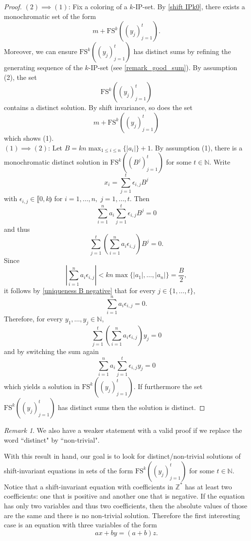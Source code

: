 \documentclass{article}
\theoremstyle{definition}
\theoremstyle{plain}
\theoremstyle{remark}
\newtheorem{remark}{Remark}[section]
\newcommand{\N}{\ensuremath{\mathbb{N}}}
\newcommand{\Z}{\ensuremath{\mathbb{Z}}}
\newcommand{\abs}[1]{\left | #1 \right |}
\newcommand{\FS}[2][]{\ensuremath{\mathrm{FS}^{#1}\left(#2\right)}}
\begin{document}
\begin{proof}
    $(2) \implies (1)$: Fix a coloring of a $k$-IP-set. By \cref{shift IPk0}, there exists a monochromatic set of the form
    $$m + \FS[k]{(y_j)_{j=1}^t}.$$
    Moreover, we can ensure $\FS[k]{(y_j)_{j=1}^t}$ has distinct sums by refining the generating sequence of the $k$-IP-set (see \cref{remark_good_sum}). By assumption (2), the set
    $$\FS[k]{(y_j)_{j=1}^t}$$
    contains a distinct solution. By shift invariance, so does the set
    $$m + \FS[k]{(y_j)_{j=1}^t}$$
    which shows (1).\\

    $(1) \implies (2)$: Let $B= kn \max_{1 \leq i \leq n} \{\abs{a_i}\} + 1$. By assumption (1), there is a monochromatic distinct solution in $\FS[k]{(B^j)_{j=1}^t}$ for some $t \in \N$.
    Write $$x_i= \sum_{j=1}^t \epsilon_{i,j} B^j$$ with $\epsilon_{i,j} \in \llbracket 0,k \rrparenthesis$ for $i=1,\ldots,n,\; j= 1,\ldots,t$. Then
    $$\sum_{i=1}^n a_i \sum_{j=1}^t \epsilon_{i,j} B^j = 0$$
    and thus
    $$\sum_{j=1}^t \left (\sum_{i=1}^n a_i  \epsilon_{i,j} \right ) B^j = 0.$$
    Since $$\abs{\sum_{i=1}^n a_i  \epsilon_{i,j}} < k n \max\{\abs{a_1},\ldots,\abs{a_n}\} = \frac{B}{2},$$
    it follows by \cref{uniqueness B negative} that for every $j\in \{1,\ldots,t\}$,
    $$\sum_{i=1}^n a_i  \epsilon_{i,j} = 0.$$
    Therefore, for every $y_1, \ldots, y_j \in \N$,
    $$\sum_{j=1}^t \left (\sum_{i=1}^n a_i  \epsilon_{i,j} \right ) y_j = 0$$
    and by switching the sum again
    $$\sum_{i=1}^n a_i \sum_{j=1}^t \epsilon_{i,j} y_j = 0$$
    which yields a solution in $\FS[k]{(y_j)_{j=1}^t}$. If furthermore the set $\FS[k]{(y_j)_{j=1}^t}$ has distinct sums then the solution is distinct.
\end{proof}
\begin{remark}
    We also have a weaker statement with a valid proof if we replace the word “distinct" by “non-trivial".
\end{remark}

With this result in hand, our goal is to look for distinct/non-trivial solutions of shift-invariant equations in sets of the form $\FS[k]{(y_j)_{j=1}^t}$ for some $t \in \N$. Notice that a shift-invariant equation with coefficients in $\Z^*$ has at least two coefficients: one that is positive and another one that is negative. If the equation has only two variables and thus two coefficients, then the absolute values of those are the same and there is no non-trivial solution. Therefore the first interesting case is an equation with three variables of the form
$$ax + by= (a+b)z.$$
\end{document}
